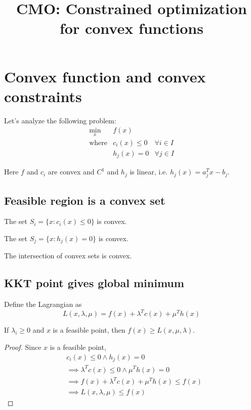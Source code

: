 


\title{CMO: Constrained optimization for convex functions}



\maketitle
\initMinimal{}

\section{Convex function and convex constraints}

Let's analyze the following problem:
\[ \begin{array}{lll}
\min_x & f(x) \\
\textrm{where} & c_i(x) \le 0 & \forall i \in I \\
& h_j(x) = 0 & \forall j \in I
\end{array} \]

Here $f$ and $c_i$ are convex and $C^1$ and $h_j$ is linear, i.e. $h_j(x) = a_j^Tx - b_j$.

\subsection{Feasible region is a convex set}

\begin{lemma}[Homework]
The set $S_i = \{x: c_i(x) \le 0\}$ is convex.
\end{lemma}
\begin{lemma}[Homework]
The set $S_j = \{x: h_j(x) = 0\}$ is convex.
\end{lemma}
\begin{lemma}[Homework]
The intersection of convex sets is convex.
\end{lemma}

\subsection{KKT point gives global minimum}

Define the Lagrangian as
\[ L(x, \lambda, \mu) = f(x) + \lambda^Tc(x) + \mu^Th(x) \]

\begin{lemma}
\label{thm:f-ge-lagr}
If $\lambda_i \ge 0$ and $x$ is a feasible point, then $f(x) \ge L(x, \mu, \lambda)$.
\end{lemma}
\begin{proof}
Since $x$ is a feasible point,
\begin{align*}
& c_i(x) \le 0 \wedge h_j(x) = 0
\\ &\implies \lambda^Tc(x) \le 0 \wedge \mu^Th(x) = 0
\\ &\implies f(x) + \lambda^Tc(x) + \mu^Th(x) \le f(x)
\\ &\implies L(x, \lambda, \mu) \le f(x)
\end{align*}
\end{proof}

